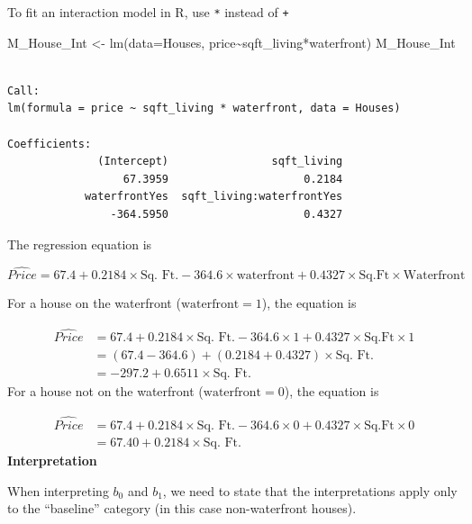 \documentclass[
  letterpaper,
  DIV=11,
  numbers=noendperiod]{scrreprt}
\newenvironment{Shaded}{\begin{snugshade}}{\end{snugshade}}
\newcommand{\AttributeTok}[1]{\textcolor[rgb]{0.40,0.45,0.13}{#1}}
\newcommand{\FunctionTok}[1]{\textcolor[rgb]{0.28,0.35,0.67}{#1}}
\newcommand{\NormalTok}[1]{\textcolor[rgb]{0.00,0.23,0.31}{#1}}
\newcommand{\OtherTok}[1]{\textcolor[rgb]{0.00,0.23,0.31}{#1}}
\newcommand{\SpecialCharTok}[1]{\textcolor[rgb]{0.37,0.37,0.37}{#1}}
\begin{document}
To fit an interaction model in R, use \texttt{*} instead of \texttt{+}

\begin{Shaded}
\begin{Highlighting}[]
\NormalTok{M\_House\_Int }\OtherTok{\textless{}{-}} \FunctionTok{lm}\NormalTok{(}\AttributeTok{data=}\NormalTok{Houses, price}\SpecialCharTok{\textasciitilde{}}\NormalTok{sqft\_living}\SpecialCharTok{*}\NormalTok{waterfront)}
\NormalTok{M\_House\_Int}
\end{Highlighting}
\end{Shaded}

\begin{verbatim}

Call:
lm(formula = price ~ sqft_living * waterfront, data = Houses)

Coefficients:
              (Intercept)                sqft_living  
                  67.3959                     0.2184  
            waterfrontYes  sqft_living:waterfrontYes  
                -364.5950                     0.4327  
\end{verbatim}

The regression equation is

\[
\widehat{Price} = 67.4 + 0.2184\times\text{Sq. Ft.}  -364.6\times\text{waterfront} + 0.4327\times\text{Sq.Ft}\times\text{Waterfront}
\]

For a house on the waterfront (\(\text{waterfront}=1\)), the equation is

\[
\begin{aligned}
\widehat{Price} & = 67.4 + 0.2184\times\text{Sq. Ft.} -364.6 \times\text{1} + 0.4327\times\text{Sq.Ft}\times\text{1} \\
& = (67.4 - 364.6) + (0.2184+0.4327)\times{\text{Sq. Ft.}} \\
& = -297.2 + 0.6511\times{\text{Sq. Ft.}}
\end{aligned}
\] For a house not on the waterfront (\(\text{waterfront}=0\)), the
equation is

\[
\begin{aligned}
\widehat{Price} & = 67.4 + 0.2184\times\text{Sq. Ft.} -364.6 \times\text{0} + 0.4327\times\text{Sq.Ft}\times\text{0} \\
& = 67.4 0 + 0.2184\times{\text{Sq. Ft.}} 
\end{aligned}
\] \textbf{Interpretation}

When interpreting \(b_0\) and \(b_1\), we need to state that the
interpretations apply only to the ``baseline'' category (in this case
non-waterfront houses).
\end{document}
